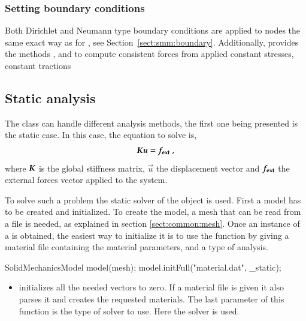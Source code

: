 \subsubsection{Setting boundary conditions}

Both Dirichlet and Neumann type boundary conditions are applied to nodes the same exact way as for , see Section~\ref{sect:smm:boundary}. Additionally,  provides the methods ,  and  to compute consistent forces from applied constant stresses, constant tractions

\subsection{Static analysis\label{sect:smm:static}}

The  class can  handle different analysis methods, the
first one being presented is the static case.  In this case, the equation
to solve is,
\begin{equation}\label{eqn:smm:static}
  \boldsymbol{K} \boldsymbol{u} = \boldsymbol{f_{{\mathrm{ext}}}}~,
\end{equation}
where  $\boldsymbol{K}$ is  the  global stiffness  matrix,  $\vec{u}$ the  displacement
vector  and  $\boldsymbol{f_{{\mathrm{ext}}}}$ the  external  forces  vector  applied to  the
system.


To     solve    such     a    problem     the    static     solver     of    the
  object is used.   First a
model has to be  created and initialized.  To create the model,  a mesh that can
be read from  a file is needed, as  explained in section \ref{sect:common:mesh}.
Once an instance of a  is obtained, the easiest way to
initialize it is  to use the 
function by  giving a  material file containing  the material parameters,  and a
type of analysis.

\begin{cpp}
  SolidMechanicsModel model(mesh);
  model.initFull("material.dat", _static);
\end{cpp}


\begin{itemize}
\item {}  initializes all the  needed vectors to zero.   If a
  material file is given it also  parses it and creates the requested materials.
  The last  parameter of this function  is the type  of solver to use.  Here the
   solver is used.
\end{itemize}


